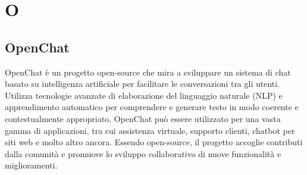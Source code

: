 \section{O}

\vspace{2em}
\subsection*{OpenChat}
OpenChat è un progetto open-source che mira a sviluppare un sistema di chat basato su intelligenza artificiale per facilitare le conversazioni tra gli utenti. Utilizza tecnologie avanzate di elaborazione del linguaggio naturale (NLP) e apprendimento automatico per comprendere e generare testo in modo coerente e contestualmente appropriato. OpenChat può essere utilizzato per una vasta gamma di applicazioni, tra cui assistenza virtuale, supporto clienti, chatbot per siti web e molto altro ancora. Essendo open-source, il progetto accoglie contributi dalla comunità e promuove lo sviluppo collaborativo di nuove funzionalità e miglioramenti.